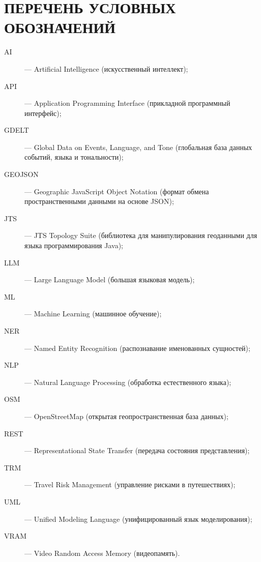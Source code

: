 \section*{ПЕРЕЧЕНЬ УСЛОВНЫХ ОБОЗНАЧЕНИЙ}

\begin{description}
    \item[AI] — Artificial Intelligence (искусственный интеллект);
    \item[API] — Application Programming Interface (прикладной программный интерфейс);
    \item[GDELT] — Global Data on Events, Language, and Tone (глобальная база данных событий, языка и тональности);
    \item[GEOJSON] — Geographic JavaScript Object Notation (формат обмена пространственными данными на основе JSON);
    \item[JTS] — JTS Topology Suite (библиотека для манипулирования геоданными для языка программирования Java);
    \item[LLM] — Large Language Model (большая языковая модель);
    \item[ML] — Machine Learning (машинное обучение);
    \item[NER] — Named Entity Recognition (распознавание именованных сущностей);
    \item[NLP] — Natural Language Processing (обработка естественного языка);
    \item[OSM] — OpenStreetMap (открытая геопространственная база данных);
    \item[REST] — Representational State Transfer (передача состояния представления);
    \item[TRM] — Travel Risk Management (управление рисками в путешествиях);
    \item[UML] — Unified Modeling Language (унифицированный язык моделирования);
    \item[VRAM] — Video Random Access Memory (видеопамять).
\end{description}